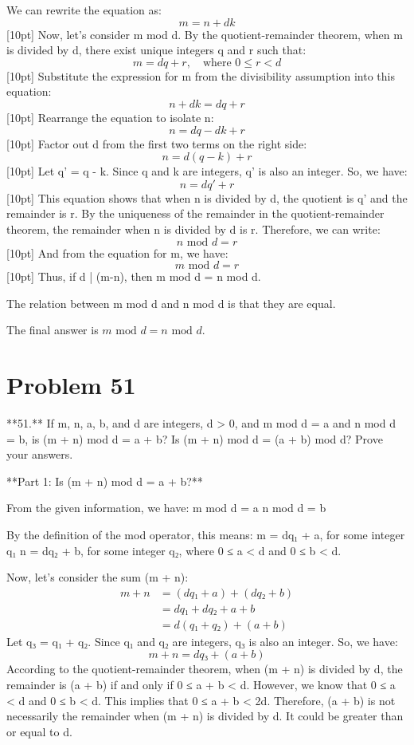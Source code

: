 \documentclass{article}
\begin{document}
We can rewrite the equation as:
$$m = n + dk$$
[10pt]
Now, let's consider m mod d. By the quotient-remainder theorem, when m is divided by d, there exist unique integers q and r such that:
$$m = dq + r, \quad \text{where } 0 \leq r < d$$
[10pt]
Substitute the expression for m from the divisibility assumption into this equation:
$$n + dk = dq + r$$
[10pt]
Rearrange the equation to isolate n:
$$n = dq - dk + r$$
[10pt]
Factor out d from the first two terms on the right side:
$$n = d(q - k) + r$$
[10pt]
Let q' = q - k. Since q and k are integers, q' is also an integer. So, we have:
$$n = dq' + r$$
[10pt]
This equation shows that when n is divided by d, the quotient is q' and the remainder is r.
By the uniqueness of the remainder in the quotient-remainder theorem, the remainder when n is divided by d is r.
Therefore, we can write:
$$n \text{ mod } d = r$$
[10pt]
And from the equation for m, we have:
$$m \text{ mod } d = r$$
[10pt]
Thus, if d | (m-n), then m mod d = n mod d.

The relation between m mod d and n mod d is that they are equal.

The final answer is $\boxed{m \text{ mod } d = n \text{ mod } d}$.

\newpage

\section*{Problem 51}
**51.** If m, n, a, b, and d are integers, d > 0, and m mod d = a and n mod d = b, is (m + n) mod d = a + b? Is (m + n) mod d = (a + b) mod d? Prove your answers.

**Part 1: Is (m + n) mod d = a + b?**

From the given information, we have:
m mod d = a
n mod d = b

By the definition of the mod operator, this means:
m = dq₁ + a, for some integer q₁
n = dq₂ + b, for some integer q₂, where 0 ≤ a < d and 0 ≤ b < d.

Now, let's consider the sum (m + n):
$$
\begin{align*}
m + n &= (dq₁ + a) + (dq₂ + b) \\
&= dq₁ + dq₂ + a + b \\
&= d(q₁ + q₂) + (a + b)
\end{align*}
$$
Let q₃ = q₁ + q₂. Since q₁ and q₂ are integers, q₃ is also an integer.
So, we have:
$$
m + n = dq₃ + (a + b)
$$
According to the quotient-remainder theorem, when (m + n) is divided by d, the remainder is (a + b) if and only if 0 ≤ a + b < d.
However, we know that 0 ≤ a < d and 0 ≤ b < d. This implies that 0 ≤ a + b < 2d.
Therefore, (a + b) is not necessarily the remainder when (m + n) is divided by d. It could be greater than or equal to d.
\end{document}
